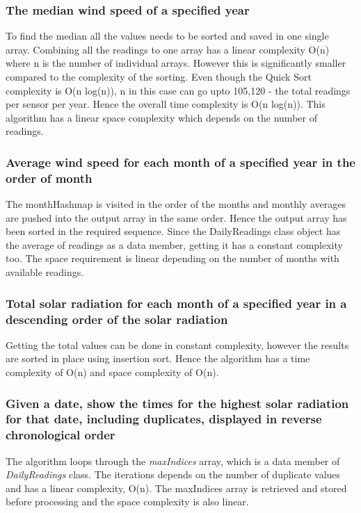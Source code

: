 \documentclass[12pt]{article}
\begin{document}
\subsubsection{The median wind speed of a specified year}
To find the median all the values needs to be sorted and saved in one single array. Combining all the readings to one array has a linear complexity O(n) where n is the number of individual arrays. However this is significantly smaller compared to the complexity of the sorting. Even though the Quick Sort complexity is O(n log(n)), n in this case can go upto 105,120 - the total readings per sensor per year. Hence the overall time complexity is O(n log(n)). This algorithm has a linear space complexity which depends on the number of readings.
\subsubsection{Average wind speed for each month of a specified year in the order of month}
The monthHashmap is visited in the order of the months and monthly averages are pushed into the output array in the same order. Hence the output array has been sorted in the required sequence. Since the DailyReadings class object has the average of readings as a data member, getting it has a constant complexity too. The space requirement is linear depending on the number of months with available readings.
\subsubsection{Total solar radiation for each month of a specified year in a descending order of the solar radiation}
Getting the total values can be done in constant complexity, however the results are sorted in place using insertion sort. Hence the algorithm has a time complexity of O(n) and space complexity of O(n).
\subsubsection{Given a date, show the times for the highest solar radiation for that date, including duplicates, displayed in reverse chronological order}
The algorithm loops through the {\em maxIndices} array, which is a data member of {\em DailyReadings} class. The iterations depends on the number of duplicate values and has a linear complexity, O(n). The maxIndices array is retrieved and stored before processing and the space complexity is also linear. \\
\printbibliography[title=References]
\end{document}
